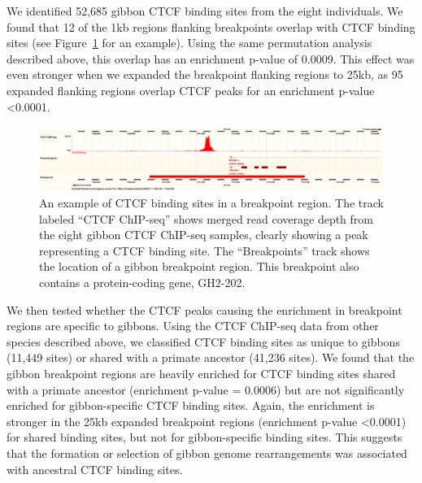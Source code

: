 We identified 52,685 gibbon CTCF binding sites from the eight individuals. We found that 12 of the 1kb regions flanking breakpoints overlap with CTCF binding sites (see Figure~\ref{example_ctcf_breakpoint} for an example). Using the same permutation analysis described above, this overlap has an enrichment p-value of 0.0009. This effect was even stronger when we expanded the breakpoint flanking regions to 25kb, as 95 expanded flanking regions overlap CTCF peaks for an enrichment p-value <0.0001.

\begin{figure}
\centering
\includegraphics[width=1\textwidth]{figures/merged_CTCF_GL397331.pdf}
\caption[An example of CTCF binding sites in a breakpoint region.]{An example of CTCF binding sites in a breakpoint region. The track labeled ``CTCF ChIP-seq'' shows merged read coverage depth from the eight gibbon CTCF ChIP-seq samples, clearly showing a peak representing a CTCF binding site. The ``Breakpoints'' track shows the location of a gibbon breakpoint region. This breakpoint also contains a protein-coding gene, GH2-202.}
\label{example_ctcf_breakpoint}
\end{figure}

We then tested whether the CTCF peaks causing the enrichment in breakpoint regions are specific to gibbons. Using the CTCF ChIP-seq data from other species described above, we classified CTCF binding sites as unique to gibbons (11,449 sites) or shared with a primate ancestor (41,236 sites). We found that the gibbon breakpoint regions are heavily enriched for CTCF binding sites shared with a primate ancestor (enrichment p-value = 0.0006) but are not significantly enriched for gibbon-specific CTCF binding sites. Again, the enrichment is stronger in the 25kb expanded breakpoint regions (enrichment p-value <0.0001) for shared binding sites, but not for gibbon-specific binding sites. This suggests that the formation or selection of gibbon genome rearrangements was associated with ancestral CTCF binding sites.


